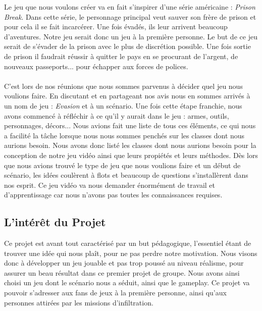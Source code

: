 \documentclass{report}
\begin{document}
Le jeu que nous voulons créer va en fait s'inspirer d'une série américaine : \textit{Prison Break}. Dans cette série, le personnage principal veut sauver son frère de prison et pour cela il se fait incarcérer. Une fois évadés, ils leur arrivent beaucoup d'aventures. Notre jeu serait donc un jeu à la première personne. Le but de ce jeu serait de s'évader de la prison avec le plus de discrétion possible. Une fois sortie de prison il faudrait réussir à quitter le pays en se procurant de l'argent, de nouveaux passeports... pour échapper aux forces de polices.\\\\

C'est lors de nos réunions que nous sommes parvenus à décider quel jeu nous voulions faire. En discutant et en partageant nos avis nous en sommes arrivés à un nom de jeu : \textit{Evasion} et à un scénario. Une fois cette étape franchie, nous avons commencé à réfléchir à ce qu'il y aurait dans le jeu : armes, outils, personnages, décors... Nous avions fait une liste de tous ces éléments, ce qui nous a facilité la tâche lorsque nous nous sommes penchés sur les classes dont nous aurions besoin. Nous avons donc listé les classes dont nous aurions besoin pour la conception de notre jeu vidéo ainsi que leurs propiétés et leurs méthodes. Dès lors que nous avions trouvé le type de jeu que nous voulions faire et un début de scénario, les idées coulèrent à flots et beaucoup de questions s'installèrent dans nos esprit. Ce jeu vidéo va nous demander énormément de travail et d'apprentissage car nous n'avons pas toutes les connaissances requises.

\subsection[L'intérêt du Projet]{L'intérêt du Projet}

Ce projet est avant tout caractérisé par un but pédagogique, l'essentiel étant de trouver une idée qui nous plaît, pour ne pas perdre notre motivation. Nous visons donc à développer un jeu jouable et pas trop poussé au niveau réalisme, pour assurer un beau résultat dans ce premier projet de groupe. Nous avons ainsi choisi un jeu dont le scénario nous a séduit, ainsi que le gameplay. Ce projet va pouvoir s'adresser aux fans de jeux à la première personne, ainsi qu'aux personnes attirées par les missions d'infiltration.\\
\end{document}
